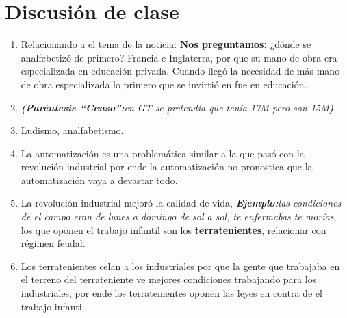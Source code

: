 \section{Discusión de clase}
\begin{enumerate}
    \item Relacionando a el tema de la noticia: \textbf{Nos preguntamos:} ¿dónde se analfebetizó de primero? Francia e Inglaterra, por que su mano de obra era especializada en educación privada. Cuando llegó la necesidad de más mano de obra especializada lo primero que se invirtió en fue en educación.
    \item \emph{\textbf{(Paréntesis ``Censo'':}en GT se pretendía que tenía 17M pero son 15M\textbf{)}}
    \item Ludismo, analfabetismo.
    \item La automatización es una problemática similar a la que pasó con la revolución industrial por ende la automatización no pronostica que la automatización vaya a devastar todo.
    \item La revolución industrial mejoró la calidad de vida, \emph{\textbf{Ejemplo:}las condiciones de el campo eran de lunes a domingo de sol a sol, te enfermabas te morías}, los que oponen el trabajo infantil son los \textbf{terratenientes}, relacionar con régimen feudal.
    \item Los terratenientes celan a los industriales por que la gente que trabajaba en el terreno del terrateniente ve mejores condiciones trabajando para los industriales, por ende los terratenientes oponen las leyes en contra de el trabajo infantil.
\end{enumerate}
